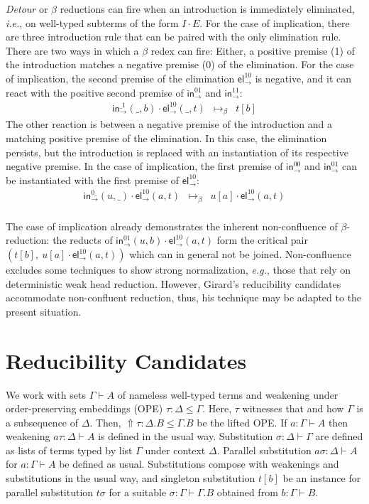 \documentclass[a4paper,USenglish,cleveref, autoref, thm-restate]{lipics-v2019}
\newcommand{\ie}{\emph{i.e.}\xspace}
\newcommand{\eg}{\emph{e.g.}\xspace}
\newcommand{\tin}{\ensuremath{\mathsf{in}}}
\newcommand{\inn}[2]{\tin_{#1}^{#2}}
\newcommand{\tel}{\mathsf{el}}
\newcommand{\el}[2]{\tel_{#1}^{#2}}
\newcommand{\contract}[1][]{\mapsto_{#1}}
\newcommand{\Up}{\mathop{\Uparrow}}
\begin{document}
\emph{Detour} or $\beta$ reductions can fire when an introduction is
immediately eliminated, \ie, on well-typed subterms of the form $I
\cdot E$.  For the case of implication, there are three
introduction rule that can be paired with the only elimination rule.
There are two ways in which a $\beta$ redex can fire:  Either, a
positive premise (1) of the introduction matches a negative premise
(0) of the elimination.  For the case of implication, the second
premise of the elimination $\el\to{10}$
is negative, and it can react with the
positive second premise of $\inn\to{01}$ and $\inn\to{11}$:
\[
\begin{array}{lll}
  \inn\to{\_1}(\_,b) \cdot \el\to{10}(\_,t)
    & \contract[\beta] &
  t[b]
\end{array}
\]
The other reaction is between a negative premise of the introduction
and a matching positive premise of the elimination.  In this case, the
elimination persists, but the introduction is replaced with an
instantiation of its respective negative premise.  In the case of
implication, the first premise of $\inn\to{00}$ and $\inn\to{01}$ can
be instantiated with the first premise of $\el\to{10}$:
\[
\begin{array}{lll}
  \inn\to{0\_}(u,\_) \cdot \el\to{10}(a,t)
    & \contract[\beta] &
  u[a] \cdot \el\to{10}(a,t)
\\
\end{array}
\]

The case of implication already demonstrates the inherent
non-confluence of $\beta$-reduction: the reducts of
$\inn\to{01}(u,b) \cdot \el\to{10}(a,t)$ form the critical pair
$(t[b],\ u[a] \cdot \el\to{10}(a,t))$ which can in general not be
joined.  Non-confluence excludes some techniques to show strong
normalization, \eg, those that rely on deterministic weak head
reduction.  However, Girard's reducibility candidates accommodate
non-confluent reduction, thus, his technique may be adapted to the
present situation.

\section{Reducibility Candidates}
\label{sec:cr}

We work with sets $\Gamma \vdash A$ of nameless well-typed terms and
weakening under order-preserving embeddings (OPE)
$\tau : \Delta \leq \Gamma$.  Here, $\tau$ witnesses that and how
$\Gamma$ is a subsequence of $\Delta$.
Then, $\Up\tau : \Delta.B \leq \Gamma.B$ be the lifted OPE.
If $a : \Gamma \vdash A$ then
weakening $a\tau : \Delta \vdash A$ is defined in the usual way.
Substitution $\sigma : \Delta \vdash \Gamma$ are defined as lists of
terms typed by list $\Gamma$ under context $\Delta$.  Parallel
substitution $a\sigma : \Delta \vdash A$ for $a : \Gamma \vdash A$ be
defined as usual.  Substitutions compose with weakenings and
substitutions in the usual way, and singleton substitution $t[b]$ be
an instance for parallel substitution $t\sigma$ for a suitable
$\sigma : \Gamma \vdash \Gamma.B$ obtained from $b : \Gamma \vdash B$.
\end{document}
